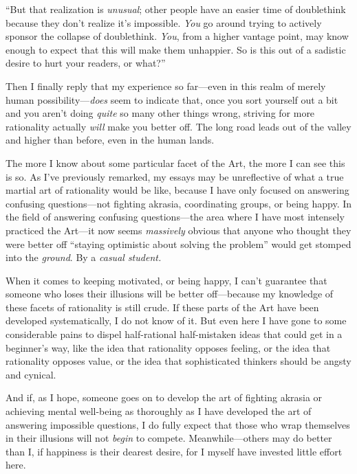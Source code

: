 {
 ``But that realization is \textit{unusual}; other
people have an easier time of doublethink because they
don't realize it's impossible.
\textit{You} go around trying to actively sponsor the collapse of
doublethink. \textit{You}, from a higher vantage point, may know enough
to expect that this will make them unhappier. So is this out of a
sadistic desire to hurt your readers, or what?''}

{
 Then I finally reply that my experience so far---even in this
realm of merely human possibility---\textit{does} seem to indicate
that, once you sort yourself out a bit and you aren't
doing \textit{quite} so many other things wrong, striving for more
rationality actually \textit{will} make you better off. The long road
leads out of the valley and higher than before, even in the human
lands.}

{
 The more I know about some particular facet of the Art, the more I
can see this is so. As I've previously remarked, my
essays may be unreflective of what a true martial art of rationality
would be like, because I have only focused on answering confusing
questions---not fighting akrasia, coordinating groups, or being happy.
In the field of answering confusing questions---the area where I have
most intensely practiced the Art---it now seems \textit{massively}
obvious that anyone who thought they were better off
``staying optimistic about solving the
problem'' would get stomped into the \textit{ground}.
By a \textit{casual student.}}

{
 When it comes to keeping motivated, or being happy, I
can't guarantee that someone who loses their illusions
will be better off---because my knowledge of these facets of
rationality is still crude. If these parts of the Art have been
developed systematically, I do not know of it. But even here I have
gone to some considerable pains to dispel half-rational half-mistaken
ideas that could get in a beginner's way, like the idea
that rationality opposes feeling, or the idea that rationality opposes
value, or the idea that sophisticated thinkers should be angsty and
cynical.}

{
 And if, as I hope, someone goes on to develop the art of fighting
akrasia or achieving mental well-being as thoroughly as I have
developed the art of answering impossible questions, I do fully expect
that those who wrap themselves in their illusions will not
\textit{begin} to compete. Meanwhile---others may do better than I, if
happiness is their dearest desire, for I myself have invested little
effort here.}

